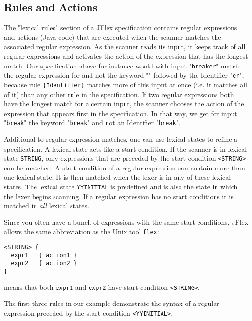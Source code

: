 \documentclass[11pt]{scrartcl}
\newcommand{\trit}{\em}
\begin{document}
\subsection{Rules and Actions\label{ExampleLexRules}}
The "lexical rules" section of a JFlex specification contains regular expressions
and actions (Java code) that are executed when the scanner matches the
associated regular expression. As the scanner reads its input, it keeps
track of all regular expressions and activates the action of the expression
that has the longest match. Our specification above for instance would with input
"\texttt{breaker}" match the regular expression for \texttt{}
and not the keyword "\texttt{}"
followed by the Identifier "\texttt{er}", because rule \verb+{Identifier}+
matches more of this input at once (i.e. it matches all of it)
than any other rule in the specification. If two regular expressions both 
have the longest match for a certain input, the scanner chooses the action 
of the expression that appears first in the specification. In that way, we 
get for input "\texttt{break}" the keyword "\texttt{break}" and not an 
Identifier "\texttt{break}". 

Additional to regular expression matches, one can use lexical states to
refine a specification. A lexical state acts like a start condition.
If the scanner is in lexical state \texttt{STRING}, only expressions that
are preceded by the start condition \texttt{<STRING>} can be matched.
A start condition of a regular expression can contain more than one lexical
state. It is then matched when the lexer is in any of these lexical states.
The lexical state \texttt{YYINITIAL} is predefined and is also the state
in which the lexer begins scanning. If a regular expression has no start
conditions it is matched in {\trit all} lexical states.
\label{ExampleRulesStateBunch}

Since you often have a bunch of expressions with the same start conditions, 
JFlex allows the same abbreviation as the Unix tool \texttt{flex}:
\begin{verbatim}
<STRING> {
  expr1   { action1 }
  expr2   { action2 }
}
\end{verbatim}
means that both \texttt{expr1} and \texttt{expr2} have start condition \texttt{<STRING>}.
\label{ExampleRulesYYINITIAL}

The first three rules in our example demonstrate the syntax of a regular 
expression preceded by the start condition \texttt{<YYINITIAL>}.
\end{document}
